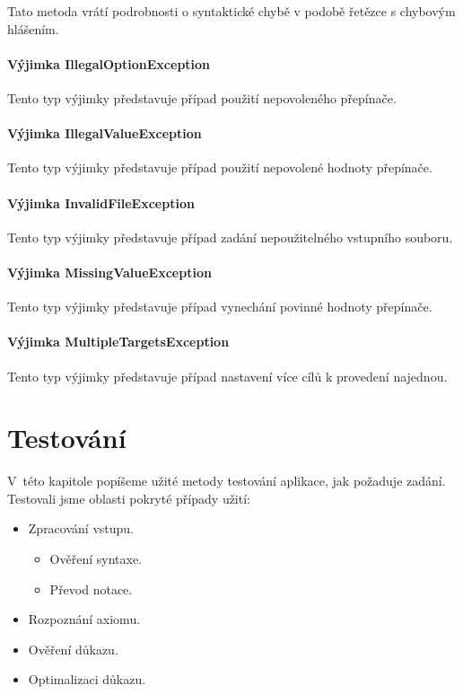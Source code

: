 \documentclass[thesis=B,czech,hidelinks]{thesis}[2012/06/26]
\begin{document}
Tato metoda vrátí podrobnosti o syntaktické chybě v podobě řetězce s chybovým hlášením.

\subsubsection{Výjimka IllegalOptionException}

Tento typ výjimky představuje případ použití nepovoleného přepínače.

\subsubsection{Výjimka IllegalValueException}

Tento typ výjimky představuje případ použití nepovolené hodnoty přepínače.

\subsubsection{Výjimka InvalidFileException}

Tento typ výjimky představuje případ zadání nepoužitelného vstupního souboru.

\subsubsection{Výjimka MissingValueException}

Tento typ výjimky představuje případ vynechání povinné hodnoty přepínače.

\subsubsection{Výjimka MultipleTargetsException}

Tento typ výjimky představuje případ nastavení více cílů k provedení najednou.

%
%
%

\chapter{Testování}

V~této kapitole popíšeme užité metody testování aplikace, jak požaduje zadání. Testovali jsme oblasti pokryté případy užití:

\begin{itemize}
	\item Zpracování vstupu.
	\begin{itemize}
		\item Ověření syntaxe.
		\item Převod notace.
	\end{itemize}
	\item Rozpoznání axiomu.
	\item Ověření důkazu.
	\item Optimalizaci důkazu.
\end{itemize}
\end{document}
